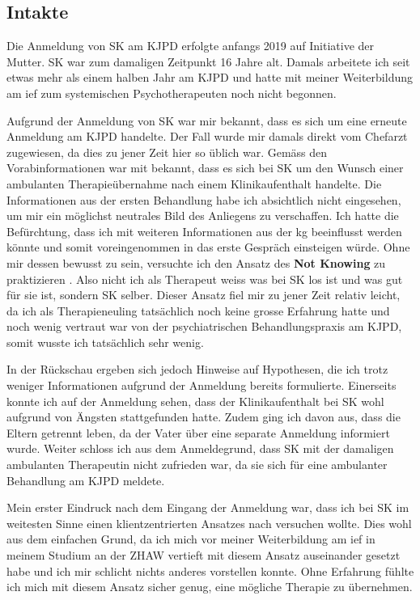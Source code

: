 \subsection{Intakte} 
Die Anmeldung von SK am KJPD erfolgte anfangs 2019 auf Initiative der Mutter. SK war zum damaligen Zeitpunkt 16 Jahre alt. Damals arbeitete ich seit etwas mehr als einem halben Jahr am KJPD und hatte mit meiner Weiterbildung am \ac{ief} zum systemischen Psychotherapeuten noch nicht begonnen. 

Aufgrund der Anmeldung von SK war mir bekannt, dass es sich um eine erneute Anmeldung am KJPD handelte. Der Fall wurde mir damals direkt vom Chefarzt zugewiesen, da dies zu jener Zeit hier so üblich war. Gemäss den Vorabinformationen war mit bekannt, dass es sich bei SK um den Wunsch einer ambulanten Therapieübernahme nach einem Klinikaufenthalt handelte. Die Informationen aus der ersten Behandlung habe ich absichtlich nicht eingesehen, um mir ein möglichst neutrales Bild des Anliegens zu verschaffen. Ich hatte die Befürchtung, dass ich mit weiteren Informationen aus der \ac{kg} beeinflusst werden könnte und somit voreingenommen in das erste Gespräch einsteigen würde. Ohne mir dessen bewusst zu sein, versuchte ich den Ansatz des \textbf{Not Knowing} zu praktizieren \cite{Anderson1992}. Also nicht ich als Therapeut weiss was bei SK los ist und was gut für sie ist, sondern SK selber. Dieser Ansatz fiel mir zu jener Zeit relativ leicht, da ich als Therapieneuling tatsächlich noch keine grosse Erfahrung hatte und noch wenig vertraut war von der psychiatrischen Behandlungspraxis am KJPD, somit wusste ich tatsächlich sehr wenig. 

In der Rückschau ergeben sich jedoch Hinweise auf Hypothesen, die ich trotz weniger Informationen aufgrund der Anmeldung bereits formulierte. Einerseits konnte ich auf der Anmeldung sehen, dass der Klinikaufenthalt bei SK wohl aufgrund von Ängsten stattgefunden hatte. Zudem ging ich davon aus, dass die Eltern getrennt leben, da der Vater über eine separate Anmeldung informiert wurde. Weiter schloss ich aus dem Anmeldegrund, dass SK mit der damaligen ambulanten Therapeutin nicht zufrieden war, da sie sich für eine ambulanter Behandlung am KJPD meldete. 

Mein erster Eindruck nach dem Eingang der Anmeldung war, dass ich bei SK im weitesten Sinne einen klientzentrierten Ansatzes nach  versuchen wollte. Dies wohl aus dem einfachen Grund, da ich mich vor meiner Weiterbildung am \ac{ief} in meinem Studium an der ZHAW vertieft mit diesem Ansatz auseinander gesetzt habe und ich mir schlicht nichts anderes vorstellen konnte. Ohne Erfahrung fühlte ich mich mit diesem Ansatz sicher genug, eine mögliche Therapie zu übernehmen.


